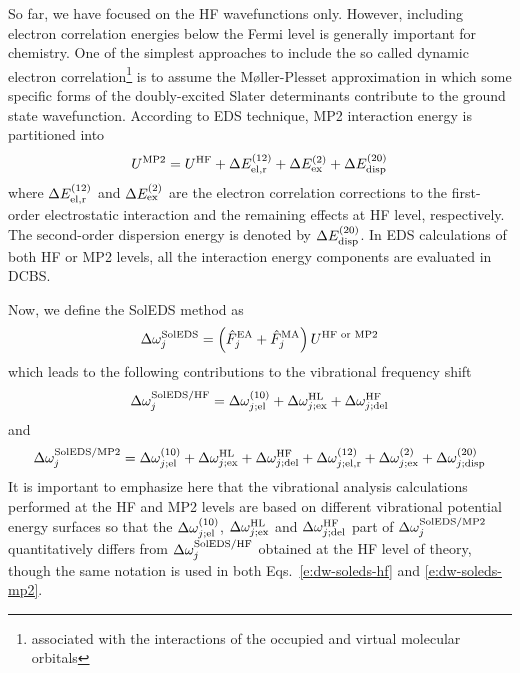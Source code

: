 \documentclass[a4paper,titlepage,twoside,fleqn,12pt]{book}
\begin{document}
\begin{refsection}
So far, we have focused on the HF wavefunctions only. However, including
electron correlation energies below the Fermi level is generally important
for chemistry. One of the simplest approaches to include the 
so called dynamic electron correlation\footnote{associated with
the interactions of the occupied and virtual molecular orbitals}
is to assume the 
M{\o}ller\hyp{}Plesset approximation\citep{Moller.Plesset.PhysRev.1934}
in which some specific forms of the doubly\hyp{}excited Slater
determinants contribute to the ground state wavefunction.
According to EDS technique, MP2 interaction energy is
partitioned into
%
\begin{equation}
 U^{\rm MP2} = U^{\rm HF}                    + 
               \Delta E_{\rm el,r}^{(12)}    + 
               \Delta E_{\rm ex}^{(2)}       +
               \Delta E_{\rm disp}^{(20)}  
\end{equation}
%
where $\Delta E_{\rm el,r}^{(12)}$ and $\Delta E_{\rm ex}^{(2)}$
are the electron correlation corrections to the first\hyp{}order
electrostatic interaction and the remaining effects at HF level,
respectively. The second\hyp{}order dispersion energy
is denoted by $\Delta E_{\rm disp}^{(20)}$. In EDS calculations
of both HF or MP2 levels,
all the interaction energy components are evaluated in DCBS.

Now, we define the SolEDS method as
%
\begin{equation}
 \Delta\omega_j^{\rm SolEDS} = \left(\hat{F}_j^{\rm EA} + \hat{F}_j^{\rm MA}\right)  U^{\rm HF\text{ or }MP2} 
\end{equation}
%
which leads to the following contributions to the vibrational
frequency shift
%
\begin{equation} \label{e:dw-soleds-hf}
 \Delta\omega_j^{\rm SolEDS/HF} = 
              \Delta \omega_{j;{\rm el}}^{(10)}    + 
              \Delta \omega_{j;{\rm ex}}^{\rm HL}  +
              \Delta \omega_{j;{\rm del}}^{\rm HF}
\end{equation}
%
and
%
\begin{equation} \label{e:dw-soleds-mp2}
 \Delta\omega_j^{\rm SolEDS/MP2} = 
              \Delta \omega_{j;{\rm el}}^{(10)}    + 
              \Delta \omega_{j;{\rm ex}}^{\rm HL}  +
              \Delta \omega_{j;{\rm del}}^{\rm HF} +
               \Delta \omega_{j;{\rm el,r}}^{(12)}    + 
               \Delta \omega_{j;{\rm ex}}^{(2)}       +
               \Delta \omega_{j;{\rm disp}}^{(20)}  
\end{equation}
%
It is important to emphasize here that the vibrational analysis 
calculations performed at the HF and MP2 levels are based on different
vibrational potential energy surfaces so that the $\Delta \omega_{j;{\rm el}}^{(10)}$,
$\Delta \omega_{j;{\rm ex}}^{\rm HL}$ and $\Delta \omega_{j;{\rm del}}^{\rm HF}$ 
part of $\Delta\omega_j^{\rm SolEDS/MP2}$ quantitatively differs from
$\Delta\omega_j^{\rm SolEDS/HF}$ obtained at the HF level of theory,
though the same notation is used in both Eqs.~\eqref{e:dw-soleds-hf} 
and \eqref{e:dw-soleds-mp2}.


\end{refsection}
\end{document}

